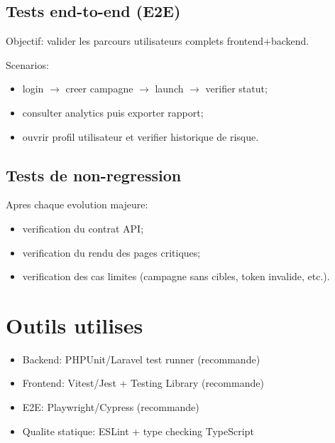 \documentclass[12pt,a4paper,oneside]{report}
\begin{document}
\subsection{Tests end-to-end (E2E)}
Objectif: valider les parcours utilisateurs complets frontend+backend.

Scenarios:
\begin{itemize}[leftmargin=1.2cm]
  \item login $\rightarrow$ creer campagne $\rightarrow$ launch $\rightarrow$ verifier statut;
  \item consulter analytics puis exporter rapport;
  \item ouvrir profil utilisateur et verifier historique de risque.
\end{itemize}

\subsection{Tests de non-regression}
Apres chaque evolution majeure:
\begin{itemize}[leftmargin=1.2cm]
  \item verification du contrat API;
  \item verification du rendu des pages critiques;
  \item verification des cas limites (campagne sans cibles, token invalide, etc.).
\end{itemize}

\section{Outils utilises}
\begin{itemize}[leftmargin=1.2cm]
  \item Backend: PHPUnit/Laravel test runner (recommande)
  \item Frontend: Vitest/Jest + Testing Library (recommande)
  \item E2E: Playwright/Cypress (recommande)
  \item Qualite statique: ESLint + type checking TypeScript
\end{itemize}
\end{document}
